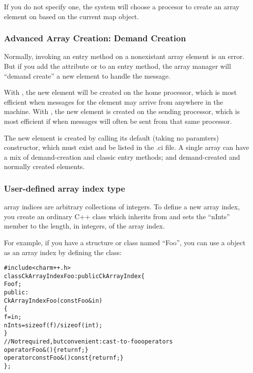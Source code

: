 If you do not specify one, the system will choose a procesor to 
create an array element on based on the current map object.



\subsubsection{Advanced Array Creation: Demand Creation}

Normally, invoking an entry method on a nonexistant array
element is an error.  But if you add the attribute
 
\kw{[createhere]} or \kw{[createhome]} to an entry method,
 the array manager will 
``demand create'' a new element to handle the message.  

With \kw{[createhome]}, the new element
will be created on the home processor, which is most efficient when messages for
the element may arrive from anywhere in the machine. With \kw{[createhere]},
the new element is created on the sending processor, which is most efficient
if when messages will often be sent from that same processor.

The new element is created by calling its default (taking no
paramters) constructor, which must exist and be listed in the .ci file.
A single array can have a mix of demand-creation and
classic entry methods; and demand-created and normally 
created elements.



\subsubsection{User-defined array index type}

\charmpp{} array indices are arbitrary collections of integers.
To define a new array index, you create an ordinary C++ class 
which inherits from  and sets the ``nInts'' member
to the length, in integers, of the array index.

For example, if you have a structure or class named ``Foo'', you 
can use a  object as an array index by defining the class:

\begin{alltt}
#include <charm++.h>
class CkArrayIndexFoo:public CkArrayIndex \{
    Foo f;
public:
    CkArrayIndexFoo(const Foo \&in) 
    \{
        f=in;
        nInts=sizeof(f)/sizeof(int);
    \}
    //Not required, but convenient: cast-to-foo operators
    operator Foo &() \{return f;\}
    operator const Foo &() const \{return f;\}
\};
\end{alltt}

